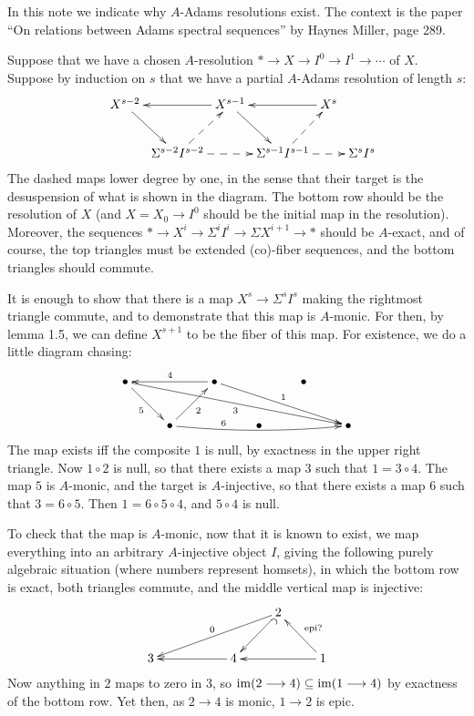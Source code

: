 \documentclass[11pt]{article}
\begin{document}
\begin{A-adams resolutions}
In this note we indicate why $A$-Adams resolutions exist. The context is the
paper ``On relations between Adams spectral sequences'' by Haynes Miller, page
289.

Suppose that we have a chosen $A$-resolution $*\to X\to I^0\to I^1\to\cdots$ of
$X$. Suppose by induction on $s$ that we have a partial $A$-Adams resolution of
length $s$:
\[\xymatrix@C=.1cm{
&X^{s-2}\ar[dr]&&X^{s-1} \ar[dr]\ar[ll]&&X^s\ar[ll]\\
&&\Sigma^{s-2}I^{s-2}\ar@{-->}[rr]\ar@{-->}[ur]
&&\Sigma^{s-1}I^{s-1}\ar@{-->}[rr]\ar@{-->}[ur]&&\Sigma^{s}I^{s}
}\]
The dashed maps lower degree by one, in the sense that their target is the
desuspension of what is shown in the diagram. The bottom row should be the
resolution of $X$ (and $X=X_0\to I^0$ should be the initial map in the
resolution). Moreover, the sequences $*\to X^i\to\Sigma^iI^i\to\Sigma
X^{i+1}\to*$ should be $A$-exact, and of course, the top triangles must be
extended (co)-fiber sequences, and the bottom triangles should commute.

It is enough to show that there is a map $X^s\to \Sigma^sI^s$ making the
rightmost triangle commute, and to demonstrate that this map is $A$-monic. For
then, by lemma 1.5, we can define $X^{s+1}$ to be the fiber of this map. For
existence, we do a little diagram chasing:
\[\xymatrix{
\bullet\ar[rd]_5\ar[rrrrrd]_3&& \bullet\ar[rrrd]^1\ar[ll]_4&&\bullet\\
&\bullet\ar[ru]_2\ar@/_.31pc/[rrrr]^(.3){6}&&\bullet&&\bullet
}\]
The map exists iff the composite $1$ is null, by exactness in the upper right
triangle. Now $1\circ2$ is null, so that there exists a map $3$ such that
$1=3\circ4$. The map $5$ is $A$-monic, and the target is $A$-injective, so that
there exists a map $6$ such that $3=6\circ5$. Then $1=6\circ5\circ4$, and
$5\circ4$ is null.

To check that the map is $A$-monic, now that it is known to exist, we map
everything into an arbitrary $A$-injective object $I$, giving the following
purely algebraic situation (where numbers represent homsets), in which the
bottom row is exact, both triangles commute, and the middle vertical map is
injective:
\[\xymatrix{
&&&2\ar[lldl]_0\ar@{^{(}->}[ld]\\
3&&\ar[ll]4&&1\ar[ll]\ar[lu]_{\text{epi?}}
}\]
Now anything in $2$ maps to zero in 3, so $\operatorname{im}(2\longrightarrow4)\subseteq\operatorname{im}(1\longrightarrow4)$ by
exactness of the bottom row. Yet then, as $2\to4$ is monic, $1\to2$ is epic.


\end{A-adams resolutions}
\end{document}
